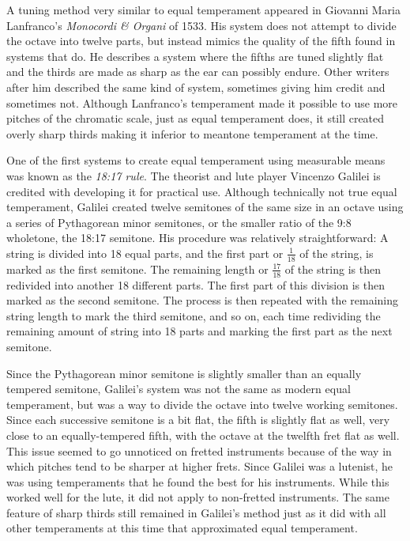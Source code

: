 A tuning method very similar to equal temperament appeared in Giovanni Maria Lanfranco's \textit{Monocordi \& Organi} of
1533. His system does not attempt to divide the octave into twelve parts, but instead mimics the quality of the fifth
found in systems that do. He describes a system where the fifths are tuned slightly flat and the thirds are made as
sharp as the ear can possibly endure. \autocite[45]{MB:1} Other writers after him described the same kind of system,
sometimes giving him credit and sometimes not. Although Lanfranco's temperament made it possible to use more pitches of
the chromatic scale, just as equal temperament does, it still created overly sharp thirds making it inferior to meantone
temperament at the time.

One of the first systems to create equal temperament using measurable means was known as the \textit{18:17 rule}. The
theorist and lute player Vincenzo Galilei is credited with developing it for practical use. \autocite[57]{MB:1}
Although technically not true equal temperament, Galilei created twelve semitones of the same size in an octave using a
series of Pythagorean minor semitones, or the smaller ratio of the 9:8 wholetone, the 18:17 semitone. His procedure was
relatively straightforward: A string is divided into 18 equal parts, and the first part or $ \frac{1}{18} $ of the
string, is marked as the first semitone. The remaining length or $ \frac{17}{18} $ of the string is then redivided into
another 18 different parts. The first part of this division is then marked as the second semitone. The process is then
repeated with the remaining string length to mark the third semitone, and so on, each time redividing the remaining
amount of string into 18 parts and marking the first part as the next semitone.

Since the Pythagorean minor semitone is slightly smaller than an equally tempered semitone, Galilei's system was not the
same as modern equal temperament, but was a way to divide the octave into twelve working semitones. Since each
successive semitone is a bit flat, the fifth is slightly flat as well, very close to an equally-tempered fifth, with the
octave at the twelfth fret flat as well. This issue seemed to go unnoticed on fretted instruments because of the way in
which pitches tend to be sharper at higher frets. Since Galilei was a lutenist, he was using temperaments that he found
the best for his instruments. While this worked well for the lute, it did not apply to non-fretted instruments. The
same feature of sharp thirds still remained in Galilei's method just as it did with all other temperaments at this time
that approximated equal temperament.

